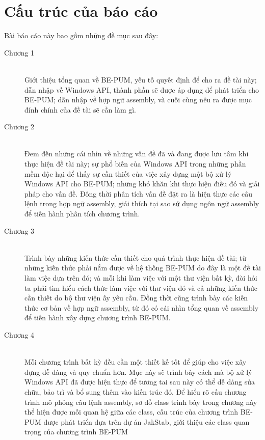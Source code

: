 \section{Cấu trúc của báo cáo}

Bài báo cáo này bao gồm những đề mục sau đây:

\begin{description}
  	\item[Chương 1] \hfill \\
	Giới thiệu tổng quan về BE-PUM, yếu tố quyết  định để cho ra đề tài này; dẫn nhập về Windows API, thành phần sẽ được áp dụng để phát triển cho BE-PUM; dẫn nhập về hợp ngữ assembly, và cuối cùng nêu ra được mục đính chính của đề tài sẽ cần làm gì. \\
 	\item[Chương 2] \hfill \\
	Đem đến những cái nhìn về những vấn đề đã và đang được lưu tâm khi thực hiện đề tài này; sự phổ biến của Windows API trong những phần mềm độc hại để thấy sự cần thiết của việc xây dựng một bộ xử lý Windows API cho BE-PUM; những khó khăn khi thực hiện điều đó và giải pháp cho vấn đề. Đông thời phân tích vấn đề đặt ra là hiện thực các câu lệnh trong hợp ngữ assembly, giải thích tại sao sử dụng ngôn ngữ assembly để tiến hành phân tích chương trình.\\
	\item[Chương 3] \hfill \\
	Trình bày những kiến thức cần thiết cho quá trình thực hiện đề tài; từ những kiến thức phải nắm được về hệ thống BE-PUM do đây là một đề tài làm việc dựa trên đó; và mỗi khi làm việc với một thư viện bất kỳ, đòi hỏi ta phải tìm hiểu cách thức làm việc với thư viện đó và cả những kiến thức cần thiết do bộ thư viện ấy yêu cầu. Đồng thời cũng trình bày các kiến thức cơ bản về hợp ngữ assembly, từ đó có cái nhìn tổng quan về assembly để tiến hành xây dựng chương trình BE-PUM. \\
	\item[Chương 4] \hfill \\
	Mỗi chương trình bất kỳ đều cần một thiết kế tốt để giúp cho việc xây dựng dễ dàng và quy chuẩn hơn. Mục này sẽ trình bày cách mà bộ xử lý Windows API đã được hiện thực để tương tai sau này có thể dễ dàng sửa chữa, bảo trì và bổ sung thêm vào kiến trúc đó. Để hiểu rõ cấu chương trình mô phỏng câu lệnh assembly, sơ đồ class trình bày trong chương này thể hiện được mối quan hệ giữa các class, cấu trúc của chương trình BE-PUM được phát triển dựa trên dự án JakStab, giới thiệu các class quan trọng của chương trình BE-PUM\\

\end{description}
